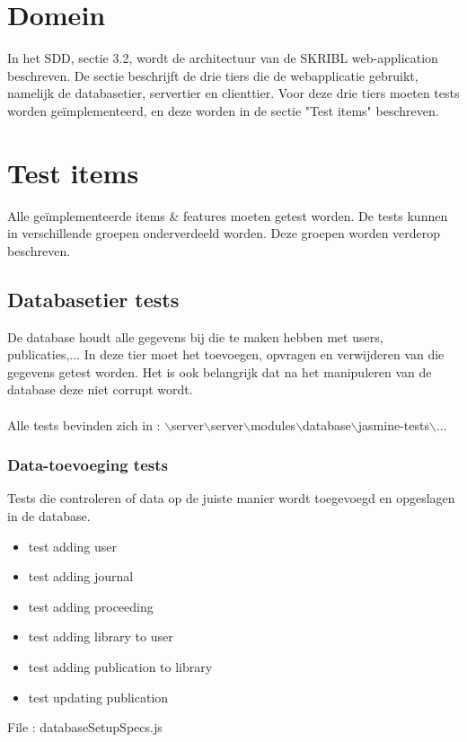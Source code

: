 \documentclass{article}
\begin{document}
\section{Domein}
In het SDD, sectie 3.2, wordt de architectuur van de SKRIBL web-application beschreven. De sectie beschrijft de drie tiers die de webapplicatie gebruikt, namelijk de databasetier, servertier en clienttier. Voor deze drie tiers moeten tests worden ge\"implementeerd, en deze worden in de sectie "Test items" beschreven.

\section{Test items}
Alle ge\"implementeerde items \& features moeten getest worden. De tests kunnen in verschillende groepen onderverdeeld worden. Deze groepen worden verderop beschreven.

\subsection{Databasetier tests}
De database houdt alle gegevens bij die te maken hebben met users, publicaties,... In deze tier moet het toevoegen, opvragen en verwijderen van die gegevens getest worden. Het is ook belangrijk dat na het manipuleren van de database deze niet corrupt wordt.
\\
\\
Alle tests bevinden zich in : $\backslash$server$\backslash$server$\backslash$modules$\backslash$database$\backslash$jasmine-tests$\backslash$...
\subsubsection{Data-toevoeging tests}
Tests die controleren of data op de juiste manier wordt toegevoegd en opgeslagen in de database.
\begin{itemize}
\item test adding user
\item test adding journal 
\item test adding proceeding
\item test adding library to user
\item test adding publication to library
\item test updating publication
\end{itemize}
File : databaseSetupSpecs.js
\end{document}
